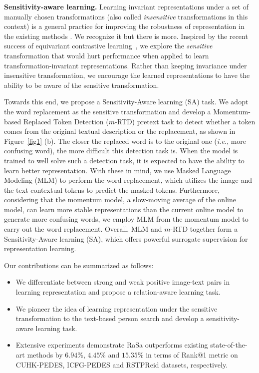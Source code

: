 \documentclass{article}
\begin{document}
\textbf{Sensitivity-aware learning.}
Learning invariant representations under a set of manually chosen transformations (also called \emph{insensitive} transformations in this context) is a general practice for improving the robustness of representation in the existing methods \cite{caron2020unsupervised,chen2021exploring}.
We recognize it but there is more.
Inspired by the recent success of equivariant contrastive learning~\cite{dangovski2022equivariant}, we explore the \emph{sensitive} transformation that would hurt performance when applied to learn transformation-invariant representations.
Rather than keeping invariance under insensitive transformation, we encourage the learned representations to have the ability to be aware of the sensitive transformation.

Towards this end, we propose a Sensitivity-Aware learning (SA) task.
We adopt the word replacement as the sensitive transformation and develop a Momentum-based Replaced Token Detection ($m$-RTD) pretext task to detect whether a token comes from the original textual description or the replacement, as shown in Figure~\ref{fig1} (b).
The closer the replaced word is to the original one (\emph{i.e.}, more confusing word), the more difficult this detection task is. 
When the model is trained to well solve such a detection task, it is expected to have the ability to learn better representation.
With these in mind, we use Masked Language Modeling (MLM) to perform the word replacement, which utilizes the image and the text contextual tokens to predict the masked tokens.
Furthermore, considering that the momentum model, a slow-moving average of the online model, can learn more stable representations than the current online model \cite{grill2020bootstrap} to generate more confusing words, we employ MLM from the momentum model to carry out the word replacement.
Overall, MLM and $m$-RTD together form a Sensitivity-Aware learning (SA), which offers powerful surrogate supervision for representation learning.

Our contributions can be summarized as follows:
\begin{itemize}
\item We differentiate between strong and weak positive image-text pairs in learning representation and propose a relation-aware learning task.
\item We pioneer the idea of learning representation under the sensitive transformation to the text-based person search and develop a sensitivity-aware learning task.
\item 
Extensive experiments demonstrate RaSa outperforms existing state-of-the-art methods by $6.94$\%, $4.45$\% and $15.35$\% in terms of Rank@1 metric on CUHK-PEDES, ICFG-PEDES and RSTPReid datasets, respectively.
\end{itemize}
\end{document}
